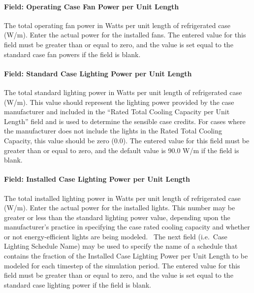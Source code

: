 \paragraph{Field: Operating Case Fan Power per Unit Length}\label{field-operating-case-fan-power-per-unit-length}

The total operating fan power in Watts per unit length of refrigerated case (W/m). Enter the actual power for the installed fans. The entered value for this field must be greater than or equal to zero, and the value is set equal to the standard case fan powers if the field is blank.

\paragraph{Field: Standard Case Lighting Power per Unit Length}\label{field-standard-case-lighting-power-per-unit-length}

The total standard lighting power in Watts per unit length of refrigerated case (W/m). This value should represent the lighting power provided by the case manufacturer and included in the ``Rated Total Cooling Capacity per Unit Length'' field and is used to determine the sensible case credits. For cases where the manufacturer does not include the lights in the Rated Total Cooling Capacity, this value should be zero (0.0). The entered value for this field must be greater than or equal to zero, and the default value is 90.0 W/m if the field is blank.

\paragraph{Field: Installed Case Lighting Power per Unit Length}\label{field-installed-case-lighting-power-per-unit-length}

The total installed lighting power in Watts per unit length of refrigerated case (W/m). Enter the actual power for the installed lights. This number may be greater or less than the standard lighting power value, depending upon the manufacturer's practice in specifying the case rated cooling capacity and whether or not energy-efficient lights are being modeled.~ The next field (i.e.~Case Lighting Schedule Name) may be used to specify the name of a schedule that contains the fraction of the Installed Case Lighting Power per Unit Length to be modeled for each timestep of the simulation period. The entered value for this field must be greater than or equal to zero, and the value is set equal to the standard case lighting power if the field is blank.

